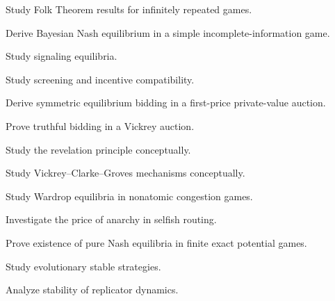 \begin{exercise}[4]
Study Folk Theorem results for infinitely repeated games.
\end{exercise}

\begin{exercise}[4]
Derive Bayesian Nash equilibrium in a simple incomplete-information game.
\end{exercise}

\begin{exercise}[4]
Study signaling equilibria.
\end{exercise}

\begin{exercise}[4]
Study screening and incentive compatibility.
\end{exercise}

\begin{exercise}[4]
Derive symmetric equilibrium bidding in a first-price private-value
auction.
\end{exercise}

\begin{exercise}[4]
Prove truthful bidding in a Vickrey auction.
\end{exercise}

\begin{exercise}[4]
Study the revelation principle conceptually.
\end{exercise}

\begin{exercise}[4]
Study Vickrey--Clarke--Groves mechanisms conceptually.
\end{exercise}

\begin{exercise}[4]
Study Wardrop equilibria in nonatomic congestion games.
\end{exercise}

\begin{exercise}[4]
Investigate the price of anarchy in selfish routing.
\end{exercise}

\begin{exercise}[4]
Prove existence of pure Nash equilibria in finite exact potential games.
\end{exercise}

\begin{exercise}[4]
Study evolutionary stable strategies.
\end{exercise}

\begin{exercise}[4]
Analyze stability of replicator dynamics.
\end{exercise}

